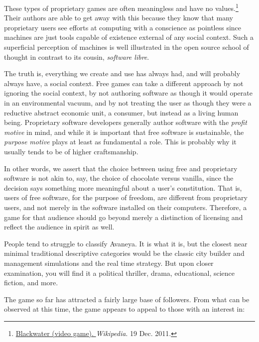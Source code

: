 These types of proprietary games are often meaningless and have no values.\footnote{\href{https://secure.wikimedia.org/wikipedia/en/wiki/Blackwater_\%28video_game\%29}{Blackwater (video game). }{\it Wikipedia}. 19 Dec. 2011.} Their authors are able to get away with this because they know that many proprietary users see efforts at computing with a conscience as pointless since machines are just tools capable of existence external of any social context. Such a superficial perception of machines is well illustrated in the open source school of thought in contrast to its cousin, {\it software libre}. 

The truth is, everything we create and use has always had, and will probably always have, a social context. Free games can take a different approach by not ignoring the social context, by not authoring software as though it would operate in an environmental vacuum, and by not treating the user as though they were a reductive abstract economic unit, a consumer, but instead as a living human being. Proprietary software developers generally author software with the {\it profit motive} in mind, and while it is important that free software is sustainable, the {\it purpose motive} plays at least as fundamental a role. This is probably why it usually tends to be of higher craftsmanship.

In other words, we assert that the choice between using free and proprietary software is not akin to, say, the choice of chocolate versus vanilla, since the decision says something more meaningful about a user's constitution. That is, users of free software, for the purpose of freedom, are different from proprietary users, and not merely in the software installed on their computers. Therefore, a game for that audience should go beyond merely a distinction of licensing and reflect the audience in spirit as well.

People tend to struggle to classify Avaneya. It is what it is, but the closest near minimal traditional descriptive categories would be the classic city builder and management simulations and the real time strategy. But upon closer examination, you will find it a political thriller, drama, educational, science fiction, and more.

The game so far has attracted a fairly large base of followers. From what can be observed at this time, the game appears to appeal to those with an interest in:

